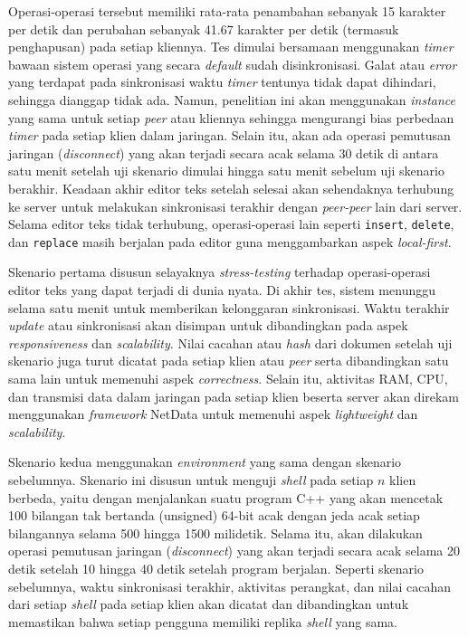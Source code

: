 Operasi-operasi tersebut memiliki rata-rata penambahan sebanyak 15 karakter per detik dan perubahan sebanyak 41.67 karakter per detik (termasuk penghapusan) pada setiap kliennya. Tes dimulai bersamaan menggunakan \textit{timer} bawaan sistem operasi yang secara \textit{default} sudah disinkronisasi. Galat atau \textit{error} yang terdapat pada sinkronisasi waktu \textit{timer} tentunya tidak dapat dihindari, sehingga dianggap tidak ada. Namun, penelitian ini akan menggunakan \textit{instance} yang sama untuk setiap \textit{peer} atau kliennya sehingga mengurangi bias perbedaan \textit{timer} pada setiap klien dalam jaringan. Selain itu, akan ada operasi pemutusan jaringan (\textit{disconnect}) yang akan terjadi secara acak selama 30 detik di antara satu menit setelah uji skenario dimulai hingga satu menit sebelum uji skenario berakhir. Keadaan akhir editor teks setelah selesai akan sehendaknya terhubung ke server untuk melakukan sinkronisasi terakhir dengan \textit{peer-peer} lain dari server. Selama editor teks tidak terhubung, operasi-operasi lain seperti \texttt{insert}, \texttt{delete}, dan \texttt{replace} masih berjalan pada editor guna menggambarkan aspek \textit{local-first}.

Skenario pertama disusun selayaknya \textit{stress-testing} terhadap operasi-operasi editor teks yang dapat terjadi di dunia nyata. Di akhir tes, sistem menunggu selama satu menit untuk memberikan kelonggaran sinkronisasi. Waktu terakhir \textit{update} atau sinkronisasi akan disimpan untuk dibandingkan pada aspek \textit{responsiveness} dan \textit{scalability}. Nilai cacahan atau \textit{hash} dari dokumen setelah uji skenario juga turut dicatat pada setiap klien atau \textit{peer} serta dibandingkan satu sama lain untuk memenuhi aspek \textit{correctness}. Selain itu, aktivitas RAM, CPU, dan transmisi data dalam jaringan pada setiap klien beserta server akan direkam menggunakan \textit{framework} NetData untuk memenuhi aspek \textit{lightweight} dan \textit{scalability}.

Skenario kedua menggunakan \textit{environment} yang sama dengan skenario sebelumnya. Skenario ini disusun untuk menguji \textit{shell} pada setiap $n$ klien berbeda, yaitu dengan menjalankan suatu program C++ yang akan mencetak 100 bilangan tak bertanda (unsigned) 64-bit acak dengan jeda acak setiap bilangannya selama 500 hingga 1500 milidetik. Selama itu, akan dilakukan operasi pemutusan jaringan (\textit{disconnect}) yang akan terjadi secara acak selama 20 detik setelah 10 hingga 40 detik setelah program berjalan. Seperti skenario sebelumnya, waktu sinkronisasi terakhir, aktivitas perangkat, dan nilai cacahan dari setiap \textit{shell} pada setiap klien akan dicatat dan dibandingkan untuk memastikan bahwa setiap pengguna memiliki replika \textit{shell} yang sama.

